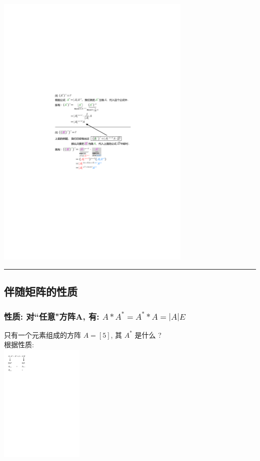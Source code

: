 \documentclass[UTF8]{ctexart}
\begin{document}
\begin{myEnvSample}
\includegraphics[width=0.7\textwidth]{img/0029.pdf}
\end{myEnvSample}



\hrule


\subsection{伴随矩阵的性质}

\subsubsection{性质: 对``任意"方阵A, 有: $A * A^{\ast} = A^{\ast} * A = |A|E$}

\begin{myEnvSample}
只有一个元素组成的方阵 $ A=[5] $, 其 $ A^*$ 是什么 ? \\

根据性质: \\
\includegraphics[width=0.3\textwidth]{img/0027.pdf}
\end{myEnvSample}
\end{document}
